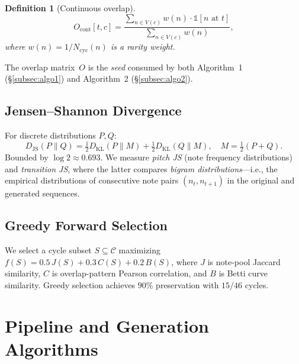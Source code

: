 \documentclass[conference,10pt,a4paper]{IEEEtran}
\newtheorem{definition}{Definition}
\begin{document}
\begin{definition}[Continuous overlap]
\begin{equation}
O_{\mathrm{cont}}[t,c] = \frac{\sum_{n \in V(c)} w(n) \cdot \mathbb{1}[n \text{ at } t]}
                               {\sum_{n \in V(c)} w(n)},
\end{equation}
where $w(n) = 1/N_{\mathrm{cyc}}(n)$ is a rarity weight.
\end{definition}

The overlap matrix~$O$ is the \emph{seed} consumed by both
Algorithm~1 (\S\ref{subsec:algo1}) and Algorithm~2 (\S\ref{subsec:algo2}).

\subsection{Jensen--Shannon Divergence}
\label{subsec:js}

For discrete distributions $P, Q$:
\begin{equation}
D_{\mathrm{JS}}(P \| Q) = \tfrac{1}{2} D_{\mathrm{KL}}(P \| M) +
                           \tfrac{1}{2} D_{\mathrm{KL}}(Q \| M),
\quad M = \tfrac{1}{2}(P+Q).
\end{equation}
Bounded by $\log 2 \approx 0.693$.  We measure \emph{pitch JS}
(note frequency distributions) and \emph{transition JS}, where
the latter compares \emph{bigram distributions}---i.e., the
empirical distributions of consecutive note pairs $(n_t, n_{t+1})$
in the original and generated sequences.

\subsection{Greedy Forward Selection}
\label{subsec:greedy}

We select a cycle subset $S \subseteq \mathcal{C}$ maximizing
$f(S) = 0.5\,J(S) + 0.3\,C(S) + 0.2\,B(S)$, where $J$ is
note-pool Jaccard similarity, $C$ is overlap-pattern Pearson
correlation, and $B$ is Betti curve similarity.  Greedy selection
achieves $90\%$ preservation with $15/46$ cycles.

\section{Pipeline and Generation Algorithms}
\label{sec:pipeline}
\end{document}
